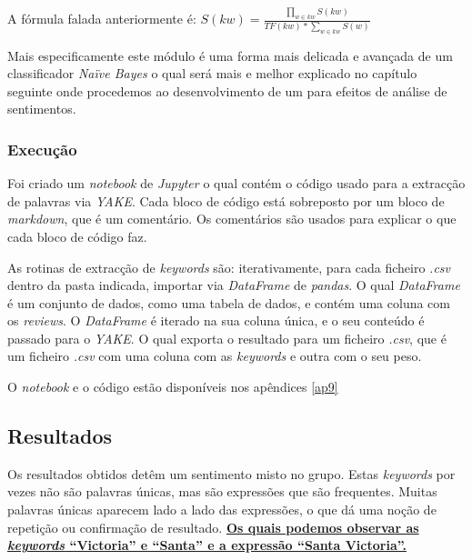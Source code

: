 A fórmula falada anteriormente é:
\begin{math}
    S(kw) = \frac{\prod_{w \in kw}^{} S(kw)}{TF(kw) * \sum_{w \in kw}^{}S(w)}
\end{math}

Mais especificamente este módulo é uma forma mais delicada e avançada de um classificador \textit{Naïve Bayes} \cite{tamgh1} \cite{tamyt1} \cite{tamyt2} \cite{tamyt3} o qual será mais e melhor explicado no capítulo seguinte onde procedemos ao desenvolvimento de um para efeitos de análise de sentimentos.

\subsubsection{Execução}

Foi criado um \textit{notebook} de \textit{Jupyter} o qual contém o código usado para a extracção de palavras via \textit{YAKE}. Cada bloco de código está sobreposto por um bloco de \textit{markdown}, que é um comentário. Os comentários são usados para explicar o que cada bloco de código faz.

As rotinas de extracção de \textit{keywords} são: iterativamente, para cada ficheiro \textit{.csv} dentro da pasta indicada, importar via \textit{DataFrame} de \textit{pandas}. O qual \textit{DataFrame} é um conjunto de dados, como uma tabela de dados, e contém uma coluna com os \textit{reviews}. O \textit{DataFrame} é iterado na sua coluna única, e o seu conteúdo é passado para o \textit{YAKE}. O qual exporta o resultado para um ficheiro \textit{.csv}, que é um ficheiro \textit{.csv} com uma coluna com as \textit{keywords} e outra com o seu peso.

O \textit{notebook} e o código estão disponíveis nos apêndices \autoref{ap9}

\subsection{Resultados}

Os resultados obtidos detêm um sentimento misto no grupo. Estas \textit{keywords} por vezes não são palavras únicas, mas são expressões que são frequentes. Muitas palavras únicas aparecem lado a lado das expressões, o que dá uma noção de repetição ou confirmação de resultado. \href{https://github.com/CatKinKitKat/pi2021/blob/master/projecto/textanalysis/keywordextraction/tripadvisor/hotels/hotel1.csv}{\textbf{Os quais podemos observar as \textit{keywords} ``Victoria'' e ``Santa'' e a expressão ``Santa Victoria''.}}

